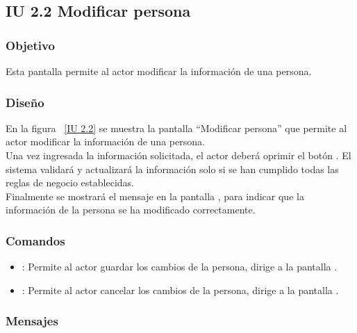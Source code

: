 \subsection{IU 2.2 Modificar persona}

\subsubsection{Objetivo}
	
    Esta pantalla permite al actor modificar la información de una persona.

\subsubsection{Diseño}

    En la figura ~\ref{IU 2.2} se muestra la pantalla ``Modificar persona'' que permite al actor modificar la información de una persona. \\
    
    Una vez ingresada la información solicitada, el actor deberá oprimir el botón . El sistema validará y actualizará la 
    información solo si se han cumplido todas las reglas de negocio establecidas.  \\
    
    Finalmente se mostrará el mensaje  en la pantalla , 
    para indicar que la información de la persona
    se ha modificado correctamente.        



\subsubsection{Comandos}
\begin{itemize}
	\item {}: Permite al actor guardar los cambios de la persona, dirige a la pantalla .
	\item {}: Permite al actor cancelar los cambios de la persona, dirige a la pantalla .
\end{itemize}

\subsubsection{Mensajes}
	
